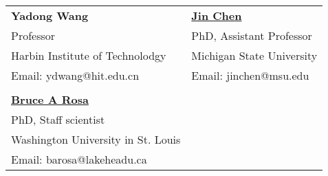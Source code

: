 \documentclass[9.5pt]{article}
\begin{document}
\begin{tabular}{ll}
{\textbf{Yadong Wang}} & \href{https://www.msu.edu/~jinchen/}{\textbf{Jin Chen}}\\
Professor & PhD, Assistant Professor\\
Harbin Institute of Technolodgy & Michigan State University\\
Email: ydwang@hit.edu.cn & Email: jinchen@msu.edu\\
\\

\href{http://genome.wustl.edu/people/individual/bruce-rosa/} {\textbf{Bruce A Rosa}} & \\
PhD, Staff scientist & \\
Washington University in St. Louis & \\
Email: barosa@lakeheadu.ca &\\

\end{tabular}
\end{document}
